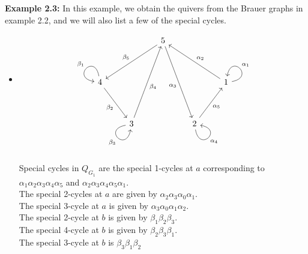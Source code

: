 \documentclass{amsart}
\numberwithin{figure}{section}
\begin{document}
\textbf{Example 2.3: } In this example, we obtain the quivers from the Brauer graphs in example 2.2, and we will also list a few of the special cycles.

\begin{itemize}
    \item[1)] 
    \leavevmode
    \[\begin{tikzcd}
	&& 5 && \\
	\\
	4 &&&& 1 \\
	\\
	& 3 && 2
	\arrow["{\beta_5}"', from=1-3, to=3-1]
	\arrow["{\alpha_3}"', from=1-3, to=5-4]
	\arrow["{\beta_1}"', from=3-1, to=3-1, loop, in=170, out=100, distance=10mm]
	\arrow["{\beta_2}"', from=3-1, to=5-2]
	\arrow["{\alpha_2}"', from=3-5, to=1-3]
	\arrow["{\alpha_1}"', from=3-5, to=3-5, loop, in=80, out=10, distance=10mm]
	\arrow["{\beta_4}"', from=5-2, to=1-3]
	\arrow["{\beta_3}"', from=5-2, to=5-2, loop, in=260, out=190, distance=10mm]
	\arrow["{\alpha_5}"', from=5-4, to=3-5]
	\arrow["{\alpha_4}"', from=5-4, to=5-4, loop, in=350, out=280, distance=10mm]
\end{tikzcd}\]

Special cycles in $Q_{G_1}$ are the special 1-cycles at $a$ corresponding to $\alpha_1\alpha_2\alpha_3\alpha_4\alpha_5$ and $\alpha_2\alpha_3\alpha_4\alpha_5\alpha_1$.\\
The special 2-cycles at $a$ are given by $\alpha_2\alpha_3\alpha_0\alpha_1$.\\
The special 3-cycle at $a$ is given by $\alpha_3\alpha_0\alpha_1\alpha_2$.\\
The special 2-cycle at $b$ is given by $\beta_1\beta_2\beta_3$.\\
The special 4-cycle at $b$ is given by $\beta_2\beta_3\beta_1$.\\
The special 3-cycle at $b$ is $\beta_3\beta_1\beta_2$


\end{itemize}
\end{document}
